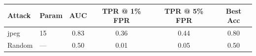 \begin{tabular}{llcccc}
\toprule
Attack & Param & AUC & TPR @ 1\% FPR & TPR @ 5\% FPR & Best Acc \\
\midrule
jpeg & 15 & 0.83 & 0.36 & 0.44 & 0.80 \\
Random & — & 0.50 & 0.01 & 0.05 & 0.50 \\
\bottomrule
\end{tabular}
